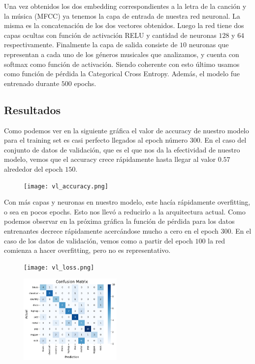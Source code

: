 \documentclass[colorinlistoftodos,twoside,twocolumn,10pt]{article} %
\begin{document}
Una vez obtenidos los dos embedding correspondientes a la letra de la canci\'on y la m\'usica (MFCC) ya tenemos la capa de entrada de nuestra red neuronal. La misma es la concatenaci\'on de los dos vectores obtenidos. Luego la red tiene  dos capas ocultas con funci\'on de activaci\'on RELU y cantidad de neuronas $128$ y $64$ respectivamente. Finalmente la capa de salida consiste de $10$ neuronas que representan a cada uno de los g\'eneros musicales que analizamos, y cuenta con softmax como funci\'on de activaci\'on. Siendo coherente con esto \'ultimo usamos como funci\'on de p\'erdida la Categorical Cross Entropy. Adem\'as, el modelo fue entrenado durante $500$ epochs.


\subsection{Resultados}

Como podemos ver en la siguiente gr\'afica el valor de accuracy de nuestro modelo para el training set es casi perfecto llegados al epoch n\'umero $300$. En el caso del conjunto de  datos de validaci\'on, que es el que nos da la efectividad de nuestro modelo, vemos que el accuracy crece r\'apidamente hasta llegar al valor $0.57$ alrededor del epoch $150$.

\begin{figure}[h!]
	\texttt{[image: vl\_accuracy.png]}
\end{figure}

Con m\'as capas y neuronas en nuestro modelo, este hac\'ia r\'apidamente overfitting, o sea en pocos epochs. Esto nos llev\'o a reducirlo a la arquitectura actual. Como podemos observar en la pr\'oxima gr\'afica la funci\'on de p\'erdida para los datos entrenantes decrece r\'apidamente acerc\'andose mucho a cero en el epoch $300$. En el caso de los datos de validaci\'on, vemos como a partir del epoch $100$ la red comienza a hacer overfitting, pero no es representativo. 

\begin{figure}[h!]
	\texttt{[image: vl\_loss.png]}
\end{figure}


\begin{figure}[h!]
	\includegraphics[width=5cm]{vl_confussion_matrix.png}
\end{figure}
\end{document}
